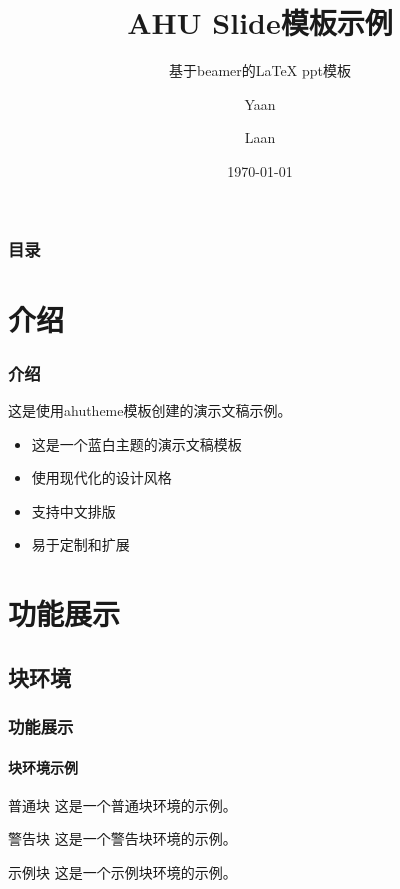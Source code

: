 \documentclass[10pt]{beamer}
\title{AHU Slide模板示例}
\subtitle{基于beamer的\LaTeX{} ppt模板}
\author{Yaan \and Laan}
\institute{Anhui University}
\date{\today}
\begin{document}
\begingroup
{}
\begin{frame}
\titlepage
\end{frame}
\endgroup

\begin{frame}
\frametitle{目录}
\tableofcontents
\end{frame}




\section{介绍}
\begin{frame}
\frametitle{介绍}
这是使用ahutheme模板创建的演示文稿示例。

\begin{itemize}
  \item 这是一个蓝白主题的演示文稿模板
  \item 使用现代化的设计风格
  \item 支持中文排版
  \item 易于定制和扩展
\end{itemize}
\end{frame}

\section{功能展示}
\subsection{块环境}
\begin{frame}
\frametitle{功能展示}
\framesubtitle{块环境示例}

\begin{block}{普通块}
这是一个普通块环境的示例。
\end{block}

\begin{alertblock}{警告块}
这是一个警告块环境的示例。
\end{alertblock}

\begin{exampleblock}{示例块}
这是一个示例块环境的示例。
\end{exampleblock}
\end{frame}
\end{document}
